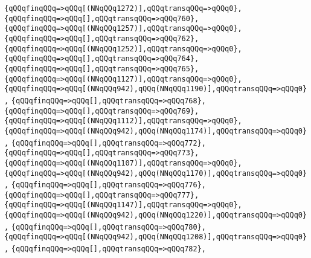 \verb|{qQQqfinqQQq=>qQQq[(NNqQQq1272)],qQQqtransqQQq=>qQQq0},|\newline
\verb|{qQQqfinqQQq=>qQQq[],qQQqtransqQQq=>qQQq760},|\newline
\verb|{qQQqfinqQQq=>qQQq[(NNqQQq1257)],qQQqtransqQQq=>qQQq0},|\newline
\verb|{qQQqfinqQQq=>qQQq[],qQQqtransqQQq=>qQQq762},|\newline
\verb|{qQQqfinqQQq=>qQQq[(NNqQQq1252)],qQQqtransqQQq=>qQQq0},|\newline
\verb|{qQQqfinqQQq=>qQQq[],qQQqtransqQQq=>qQQq764},|\newline
\verb|{qQQqfinqQQq=>qQQq[],qQQqtransqQQq=>qQQq765},|\newline
\verb|{qQQqfinqQQq=>qQQq[(NNqQQq1127)],qQQqtransqQQq=>qQQq0},|\newline
\verb|{qQQqfinqQQq=>qQQq[(NNqQQq942),qQQq(NNqQQq1190)],qQQqtransqQQq=>qQQq0},|\newline
\verb|{qQQqfinqQQq=>qQQq[],qQQqtransqQQq=>qQQq768},|\newline
\verb|{qQQqfinqQQq=>qQQq[],qQQqtransqQQq=>qQQq769},|\newline
\verb|{qQQqfinqQQq=>qQQq[(NNqQQq1112)],qQQqtransqQQq=>qQQq0},|\newline
\verb|{qQQqfinqQQq=>qQQq[(NNqQQq942),qQQq(NNqQQq1174)],qQQqtransqQQq=>qQQq0},|\newline
\verb|{qQQqfinqQQq=>qQQq[],qQQqtransqQQq=>qQQq772},|\newline
\verb|{qQQqfinqQQq=>qQQq[],qQQqtransqQQq=>qQQq773},|\newline
\verb|{qQQqfinqQQq=>qQQq[(NNqQQq1107)],qQQqtransqQQq=>qQQq0},|\newline
\verb|{qQQqfinqQQq=>qQQq[(NNqQQq942),qQQq(NNqQQq1170)],qQQqtransqQQq=>qQQq0},|\newline
\verb|{qQQqfinqQQq=>qQQq[],qQQqtransqQQq=>qQQq776},|\newline
\verb|{qQQqfinqQQq=>qQQq[],qQQqtransqQQq=>qQQq777},|\newline
\verb|{qQQqfinqQQq=>qQQq[(NNqQQq1147)],qQQqtransqQQq=>qQQq0},|\newline
\verb|{qQQqfinqQQq=>qQQq[(NNqQQq942),qQQq(NNqQQq1220)],qQQqtransqQQq=>qQQq0},|\newline
\verb|{qQQqfinqQQq=>qQQq[],qQQqtransqQQq=>qQQq780},|\newline
\verb|{qQQqfinqQQq=>qQQq[(NNqQQq942),qQQq(NNqQQq1208)],qQQqtransqQQq=>qQQq0},|\newline
\verb|{qQQqfinqQQq=>qQQq[],qQQqtransqQQq=>qQQq782},|\newline
